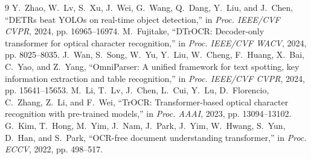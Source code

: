 \documentclass[conference]{IEEEtran}
\begin{document}
\begin{thebibliography}{9}
 Y.~Zhao, W.~Lv, S.~Xu, J.~Wei, G.~Wang, Q.~Dang, Y.~Liu,
and J.~Chen, ``DETRs beat YOLOs on real-time object detection,'' in
\emph{Proc. IEEE/CVF CVPR}, 2024, pp. 16965--16974.
 M.~Fujitake, ``DTrOCR: Decoder-only transformer for optical
character recognition,'' in \emph{Proc. IEEE/CVF WACV}, 2024, pp. 8025--8035.
 J.~Wan, S.~Song, W.~Yu, Y.~Liu, W.~Cheng, F.~Huang,
X.~Bai, C.~Yao, and Z.~Yang, ``OmniParser: A unified framework for text
spotting, key information extraction and table recognition,'' in \emph{Proc.
IEEE/CVF CVPR}, 2024, pp. 15641--15653.
 M.~Li, T.~Lv, J.~Chen, L.~Cui, Y.~Lu, D.~Florencio, C.~Zhang,
Z.~Li, and F.~Wei, ``TrOCR: Transformer-based optical character recognition
with pre-trained models,'' in \emph{Proc. AAAI}, 2023, pp. 13094--13102.
 G.~Kim, T.~Hong, M.~Yim, J.~Nam, J.~Park, J.~Yim, W.~Hwang,
S.~Yun, D.~Han, and S.~Park, ``OCR-free document understanding transformer,''
in \emph{Proc. ECCV}, 2022, pp. 498--517.
\end{thebibliography}
\end{document}
